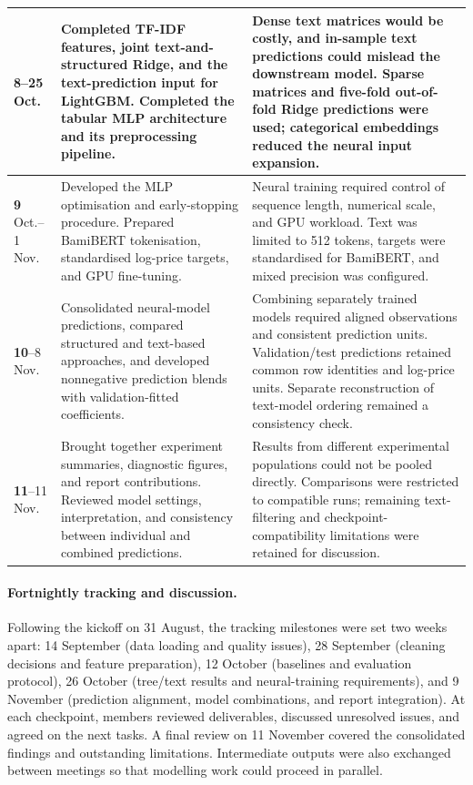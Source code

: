 \begin{longtable}{p{1.7cm}p{6.0cm}p{6.0cm}}
\textbf{8}\newline
19--25 Oct. & Completed TF-IDF features, joint text-and-structured Ridge, and the text-prediction input for LightGBM. Completed the tabular MLP architecture and its preprocessing pipeline. & Dense text matrices would be costly, and in-sample text predictions could mislead the downstream model. Sparse matrices and five-fold out-of-fold Ridge predictions were used; categorical embeddings reduced the neural input expansion. \\
\midrule

\textbf{9}\newline
26 Oct.--1 Nov. & Developed the MLP optimisation and early-stopping procedure. Prepared BamiBERT tokenisation, standardised log-price targets, and GPU fine-tuning. & Neural training required control of sequence length, numerical scale, and GPU workload. Text was limited to 512 tokens, targets were standardised for BamiBERT, and mixed precision was configured. \\
\midrule

\textbf{10}\newline
2--8 Nov. & Consolidated neural-model predictions, compared structured and text-based approaches, and developed nonnegative prediction blends with validation-fitted coefficients. & Combining separately trained models required aligned observations and consistent prediction units. Validation/test predictions retained common row identities and log-price units. Separate reconstruction of text-model ordering remained a consistency check. \\
\midrule

\textbf{11}\newline
9--11 Nov. & Brought together experiment summaries, diagnostic figures, and report contributions. Reviewed model settings, interpretation, and consistency between individual and combined predictions. & Results from different experimental populations could not be pooled directly. Comparisons were restricted to compatible runs; remaining text-filtering and checkpoint-compatibility limitations were retained for discussion. \\

\end{longtable}
\endgroup

\paragraph{Fortnightly tracking and discussion.}
Following the kickoff on 31 August, the tracking milestones were set two weeks apart: 14 September (data loading and quality issues), 28 September (cleaning decisions and feature preparation), 12 October (baselines and evaluation protocol), 26 October (tree/text results and neural-training requirements), and 9 November (prediction alignment, model combinations, and report integration). At each checkpoint, members reviewed deliverables, discussed unresolved issues, and agreed on the next tasks. A final review on 11 November covered the consolidated findings and outstanding limitations. Intermediate outputs were also exchanged between meetings so that modelling work could proceed in parallel.
